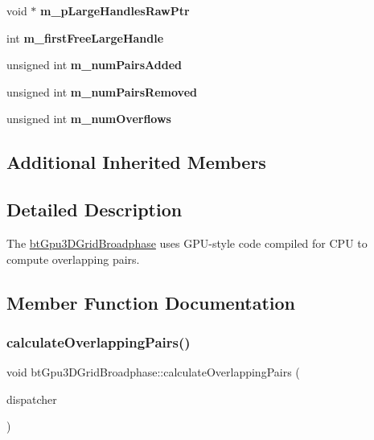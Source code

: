 \begin{DoxyCompactItemize}
void $\ast$ {\bfseries m\+\_\+p\+Large\+Handles\+Raw\+Ptr}
\item 
\mbox{\label{classbtGpu3DGridBroadphase_a03a9e6ea64a4fefa3b1f15a4059b33d9}} 
int {\bfseries m\+\_\+first\+Free\+Large\+Handle}
\item 
\mbox{\label{classbtGpu3DGridBroadphase_a8153417e6de7d4125ad3bee3dfa8f6ae}} 
unsigned int {\bfseries m\+\_\+num\+Pairs\+Added}
\item 
\mbox{\label{classbtGpu3DGridBroadphase_a77713805088e9f554f1188ef4576bf5c}} 
unsigned int {\bfseries m\+\_\+num\+Pairs\+Removed}
\item 
\mbox{\label{classbtGpu3DGridBroadphase_a2ef1d503d53d84ae625b3fd9268473af}} 
unsigned int {\bfseries m\+\_\+num\+Overflows}
\end{DoxyCompactItemize}
\subsection*{Additional Inherited Members}


\subsection{Detailed Description}
The \hyperlink{classbtGpu3DGridBroadphase}{bt\+Gpu3\+D\+Grid\+Broadphase} uses G\+P\+U-\/style code compiled for C\+PU to compute overlapping pairs. 

\subsection{Member Function Documentation}
\mbox{\label{classbtGpu3DGridBroadphase_ad25b335c5cf7be1f4eee024ff91e5635}} 
\subsubsection{\texorpdfstring{calculate\+Overlapping\+Pairs()}{calculateOverlappingPairs()}\hspace{0.1cm}{\footnotesize\ttfamily [1/2]}}
{\footnotesize\ttfamily void bt\+Gpu3\+D\+Grid\+Broadphase\+::calculate\+Overlapping\+Pairs (\begin{DoxyParamCaption}\item[{\hyperlink{classbtDispatcher}{bt\+Dispatcher} $\ast$}]{dispatcher }\end{DoxyParamCaption})\hspace{0.3cm}{\ttfamily [virtual]}}



